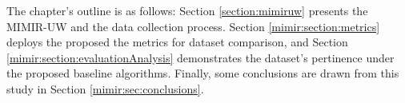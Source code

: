 The chapter's outline is as follows: Section \ref{section:mimiruw} presents the MIMIR-UW and the data collection process. Section \ref{mimir:section:metrics} deploys the proposed the metrics for dataset comparison, and Section \ref{mimir:section:evaluationAnalysis} demonstrates the dataset's pertinence under the proposed baseline algorithms. Finally, some conclusions are drawn from this study in Section \ref{mimir:sec:conclusions}.



